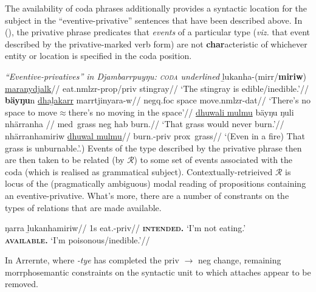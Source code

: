 \noindent The availability of coda phrases additionally provides a syntactic location for the subject in the ``eventive-privative'' sentences that have been described above. In (\nextx), the privative phrase predicates that \textit{events} of a particular type (\textit{viz.} that event described by the privative-marked verb form) are not \textbf{char}acteristic of whichever entity or location is specified in the coda position.


\pex \textit{``Eventive-privatives'' in Djambarrpuyŋu: \textsc{coda} underlined}
\a \begingl\gla ḻukanha-(mirr/\textbf{miriw}) \ul{maranydjalk}//
\glb eat.\gls{nmlzr}-\gls{prop}/\gls{priv} stingray//
\glft`The stingray is edible/inedible.'\trailingcitation{[AW~20190502]}//\endgl
\a\begingl\gla\textbf{bäyŋu}n \ul{dhaḻakarr} marrtjinyara-w//
\glb \gls{negq}.\gls{foc} space move.\gls{nmlzr}-\gls{dat}//
\glft  `There's no space to move$\approx$there's no moving in the space'//\endgl
\a \begingl \gla \ul{dhuwali mulmu} bäyŋu ŋuli nhärranha //
\glb \gls{med}~grass \gls{neg} \gls{hab} burn.\IV//
\glft`That grass would never burn.'//\endgl
\a \begingl\gla nhärranhamiriw \ul{dhuwal mulmu}//
\glb burn.\IV-\gls{priv} \gls{prox}~grass//
\glft`(Even in a fire) That grass is unburnable.'.) Events of the type described by the privative phrase then are then taken to be related (by $ \mathcal R $) to some set of events associated with the coda (which is realised as grammatical subject). Contextually-retrieived $ \mathcal R $ is locus of the (pragmatically ambiguous) modal reading of propositions containing an eventive-privative. What's more, there are a number of constrants on the types of relations that are made available.


\pex\a\begingl\gla \ljudge{$ ^\# $}ŋarra ḻukanhamiriw//
\glb 1s eat.\IV-\gls{priv}//
\glft \textbf{\textsc{intended.}} `I'm not eating.'\\
\textbf{\textsc{available.}} `I'm poisonous/inedible.'\trailingcitation{[AW~20190502]}//
\endgl
\xe{}

 In Arrernte, where \textit{-tye} has completed the \gls{priv} $ \to $ \gls{neg} change, remaining morrphosemantic constraints on the syntactic unit to which attaches appear to be removed. 


